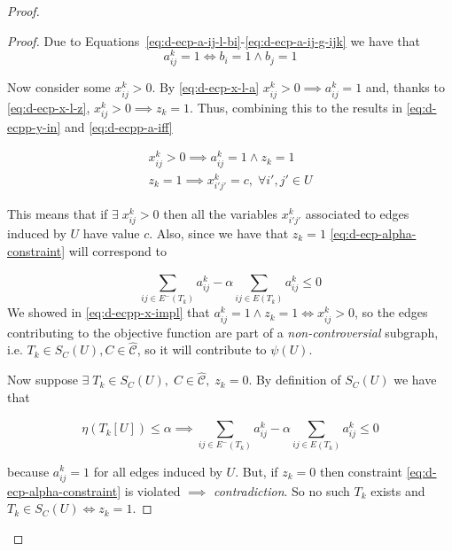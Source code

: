\begin{proof}
\begin{proof}
		Due to Equations~\ref{eq:d-ecp-a-ij-l-bi}-\ref{eq:d-ecp-a-ij-g-ijk} we
		have that
		\begin{equation}
			\label{eq:d-ecpp-a-iff}
			a_{ij}^{k} = 1 \iff b_i = 1 \land b_j = 1
		\end{equation}

		Now consider some $x_{ij}^{k} > 0 $. By \autoref{eq:d-ecp-x-l-a}
		$x_{ij}^{k} > 0 \implies a _{ij}^{k} = 1$ and, thanks to
		\autoref{eq:d-ecp-x-l-z}, $x_{ij}^{k} > 0 \implies z_k = 1$. Thus, combining
		this to the results in \autoref{eq:d-ecpp-y-in} and
		\autoref{eq:d-ecpp-a-iff}

		\begin{gather}
			\label{eq:d-ecpp-x-impl}
			x_{ij}^{k} > 0 \implies a_{ij}^{k} = 1 \land z_k =1 \\
			\label{eq:d-ecpp-z-impl}
			z_k = 1 \implies x_{i'j'}^{k} = c, \; \forall i', j' \in U
		\end{gather}

		This means that if $\exists \; x_{ij}^{k} > 0$ then all the variables
		$x_{i'j'}^{k}$ associated to edges induced by $U$ have value $c$.
		Also, since we have that $z_k = 1$ \autoref{eq:d-ecp-alpha-constraint}
		will correspond to

		\begin{equation}
			\sum^{}_{ij \in E^{-} (T_k)} a_{ij}^{k}  - \alpha \sum^{}_{ij \in E(T_k)}
			a_{ij} ^{k} \leq 0
		\end{equation}
		We showed in \autoref{eq:d-ecpp-x-impl} that $a_{ij}^{k} = 1 \land z_k
			= 1 \iff x_{ij}^{k} > 0 $, so the edges contributing to the objective
		function are part of a \emph{non-controversial} subgraph, i.e. $T_k \in
			S_C(U), C \in \mathcal{\hat{C}}$, so it will contribute to $\psi(U)$.

		Now suppose $\exists \; T_k \in S_C(U), \; C \in \mathcal{\hat{C}},
			\; z_k = 0$. By definition of $S_C(U)$ we have that

		\begin{equation}
			\eta(T_k[U]) \leq \alpha  \implies \sum^{}_{ij \in E^{-} (T_k)} a_{ij}^{k}  - \alpha \sum^{}_{ij \in E(T_k)}
			a_{ij} ^{k} \leq 0
		\end{equation}

		because $a_{ij}^{k} = 1$ for all edges induced by $U$. But, if $z_k =
			0$ then constraint \ref{eq:d-ecp-alpha-constraint} is violated
		$\implies $ \emph{contradiction}. So no such $T_k$ exists and $T_k
			\in S_C(U) \iff z_k = 1$.


\end{proof}
\end{proof}
